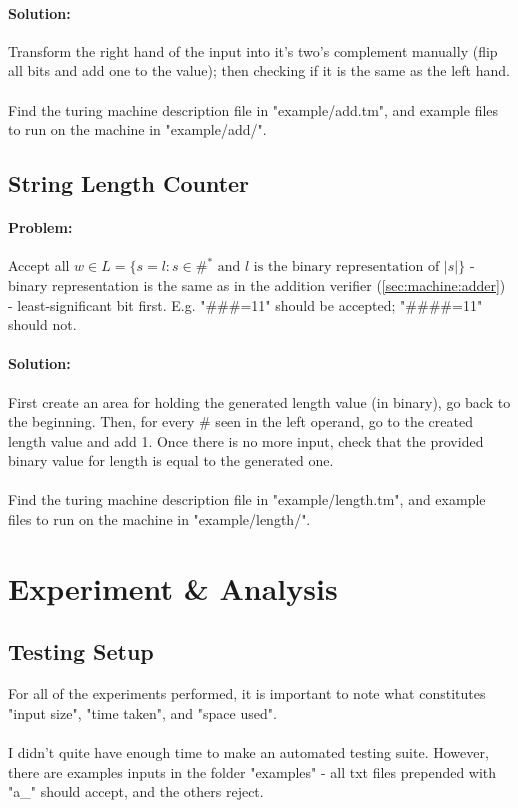 \documentclass[]{article}
\begin{document}
\paragraph{Solution:} Transform the right hand of the input into it's two's complement manually (flip all bits and add one to the value); then checking if it is the same as the left hand.
\\\\
\noindent Find the turing machine description file in "example/add.tm", and example files to run on the machine in "example/add/".

\subsection{String Length Counter}\label{sec:machine:length}
\paragraph{Problem:} Accept all $w \in L = \{s=l : s \in \#^* \text{ and } l \text{ is the binary representation of } |s|\}$ - binary representation is the same as in the addition verifier (\ref{sec:machine:adder}) - least-significant bit first. E.g. "\#\#\#=11" should be accepted; "\#\#\#\#=11" should not.

\paragraph{Solution:} First create an area for holding the generated length value (in binary), go back to the beginning. Then, for every \# seen in the left operand, go to the created length value and add 1. Once there is no more input, check that the provided binary value for length is equal to the generated one.
\\\\
\noindent Find the turing machine description file in "example/length.tm", and example files to run on the machine in "example/length/".

\section{Experiment \& Analysis}
\subsection{Testing Setup}
For all of the experiments performed, it is important to note what constitutes "input size", "time taken", and "space used".
\\\\
I didn't quite have enough time to make an automated testing suite. However, there are examples inputs in the folder "examples" - all txt files prepended with "a\_" should accept, and the others reject.
\end{document}
